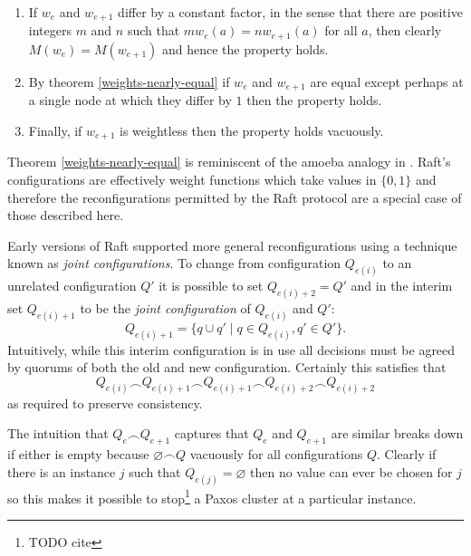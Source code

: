 \documentclass[journal]{IEEEtran}
\begin{document}
\begin{enumerate}

\item If $w_e$ and $w_{e+1}$ differ by a constant factor, in the sense that
there are positive integers $m$ and $n$ such that $m w_e(a) = n w_{e+1}(a)$ for
all $a$, then clearly ${M(w_e) = M(w_{e+1})}$ and hence the property holds.

\item By theorem \ref{weights-nearly-equal} if $w_e$ and $w_{e+1}$ are equal
except perhaps at a single node at which they differ by $1$ then the property
holds.

\item Finally, if $w_{e+1}$ is weightless then the property holds vacuously.

\end{enumerate}
%
Theorem \ref{weights-nearly-equal} is reminiscent of the amoeba analogy in
\cite{cheap-paxos}. Raft's configurations are effectively weight functions
which take values in $\{0,1\}$ and therefore the reconfigurations permitted by
the Raft protocol are a special case of those described here.

Early versions of Raft supported more general reconfigurations using a
technique known as \textit{joint configurations}. To change from configuration
$Q_{e(i)}$ to an unrelated configuration $Q'$ it is possible to set $Q_{e(i)+2}
= Q'$ and in the interim set $Q_{e(i)+1}$ to be the \textit{joint
configuration} of $Q_{e(i)}$ and $Q'$: \[Q_{e(i)+1} = \{ q \cup q' \mid q \in
Q_{e(i)}, q' \in Q' \}.\] Intuitively, while this interim configuration is in
use all decisions must be agreed by quorums of both the old and new
configuration. Certainly this satisfies that \[Q_{e(i)} \frown Q_{e(i) + 1}
\frown Q_{e(i)+1} \frown Q_{e(i) + 2} \frown Q_{e(i) + 2}\] as required to
preserve consistency.

The intuition that $Q_e \frown Q_{e+1}$ captures that $Q_e$ and $Q_{e+1}$ are
similar breaks down if either is empty because $\varnothing \frown Q$ vacuously
for all configurations $Q$. Clearly if there is an instance $j$ such that
$Q_{e(j)} = \varnothing$ then no value can ever be chosen for $j$ so this
makes it possible to stop\footnote{TODO cite} a Paxos cluster at a particular
instance.
\end{document}
